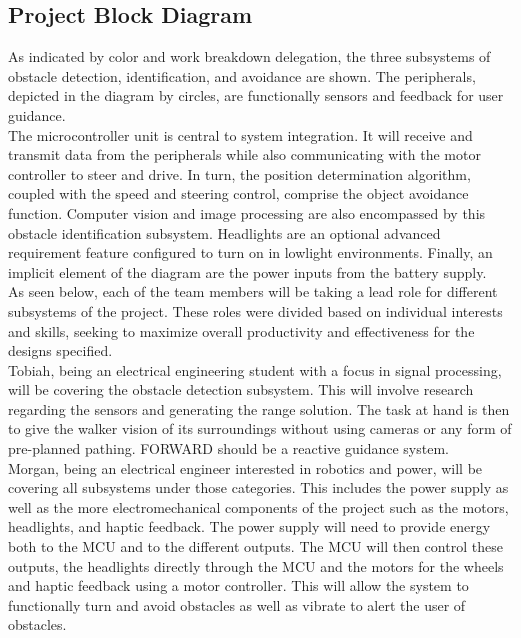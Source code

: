 \subsection{Project Block Diagram}
\noindent As indicated by color and work breakdown delegation, the three subsystems of obstacle detection, identification, and avoidance are shown. The peripherals, depicted in the diagram by circles, are functionally sensors and feedback for user guidance. \\

\noindent The microcontroller unit is central to system integration. It will receive and transmit data from the peripherals while also communicating with the motor controller to steer and drive. In turn, the position determination algorithm, coupled with the speed and steering control, comprise the object avoidance function. Computer vision and image processing are also encompassed by this obstacle identification subsystem. Headlights are an optional advanced requirement feature configured to turn on in lowlight environments. Finally, an implicit element of the diagram are the power inputs from the battery supply.\\

\noindent As seen below, each of the team members will be taking a lead role for different subsystems of the project. These roles were divided based on individual interests and skills, seeking to maximize overall productivity and effectiveness for the designs specified.\\

\noindent Tobiah, being an electrical engineering student with a focus in signal processing, will be covering the obstacle detection subsystem. This will involve research regarding the sensors and generating the range solution. The task at hand is then to give the walker vision of its surroundings without using cameras or any form of pre-planned pathing. FORWARD should be a reactive guidance system. \\

\noindent Morgan, being an electrical engineer interested in robotics and power, will be covering all subsystems under those categories. This includes the power supply as well as the more electromechanical components of the project such as the motors, headlights, and haptic feedback. The power supply will need to provide energy both to the MCU and to the different outputs. The MCU will then control these outputs, the headlights directly through the MCU and the motors for the wheels and haptic feedback using a motor controller. This will allow the system to functionally turn and avoid obstacles as well as vibrate to alert the user of obstacles. \\

